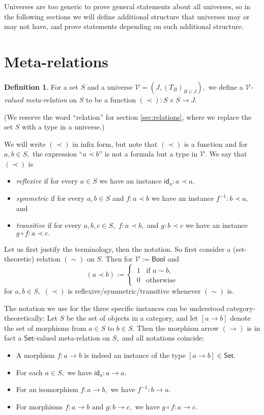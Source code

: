 \documentclass[a4paper]{article}
\theoremstyle{definition}
\newtheorem{definition}{Definition}[section]
\theoremstyle{remark}
\newcommand{\defn}{\emph}
\newcommand{\V}{\mathcal{V}}
\newcommand{\nm}{\mathsf}
\newcommand{\universe}{\nm}
\newcommand{\Bool}{\universe{Bool}}
\newcommand{\Set}{\universe{Set}}
\newcommand{\id}{\nm{id}}
\begin{document}
Universes are too generic to prove general statements about all universes, so in the following sections
we will define additional structure that universes may or may not have, and prove statements depending
on such additional structure.

\section{Meta-relations}
\label{sec:meta-relations}

\begin{definition}
  For a set $S$ and a universe $\V = (J, (T_B)_{B \in J}),$ we define a \defn{$\V$-valued meta-relation}
  on $S$ to be a function $(\prec) : S \times S \to J.$
\end{definition}

(We reserve the word ``relation'' for section \ref{sec:relations}, where we replace the set $S$ with a type
in a universe.)

We will write $(\prec)$ in infix form, but note that $(\prec)$ is a function and for $a,b \in S,$ the
expression ``$a \prec b$'' is not a formula but a type in $\V.$
We say that $(\prec)$ is
\begin{itemize}
  \item \defn{reflexive} if for every $a \in S$ we have an instance $\id_a : a \prec a,$
  \item \defn{symmetric} if for every $a,b \in S$ and $f : a \prec b$ we have an instance
  $f^{-1} : b \prec a,$ and
  \item \defn{transitive} if for every $a,b,c \in S,$ $f : a \prec b,$ and $g : b \prec c$ we have an
  instance $g \circ f : a \prec c.$
\end{itemize}

Let us first justify the terminology, then the notation. So first consider a (set-theoretic) relation
$(\sim)$ on $S.$ Then for $\V := \Bool$ and
\[(a \prec b) := \begin{cases}
  \, 1 & \text{if } a \sim b,\\
  \, 0 & \text{otherwise}
\end{cases}\]
for $a,b \in S,$ $(\prec)$ is reflexive/symmetric/transitive whenever $(\sim)$ is.

The notation we use for the three specific instances can be understood category-theoretically:
Let $S$ be the set of objects in a category, and let $[a \to b]$ denote the set of morphisms
from $a \in S$ to $b \in S.$ Then the morphism arrow $(\to)$ is in fact a $\Set$-valued
meta-relation on $S,$ and all notations coincide:
\begin{itemize}
  \item A morphism $f : a \to b$ is indeed an instance of the type $[a \to b] \in \Set.$
  \item For each $a \in S,$ we have $\id_a : a \to a.$
  \item For an isomorphism $f : a \to b,$ we have $f^{-1} : b \to a.$
  \item For morphisms $f : a \to b$ and $g : b \to c,$ we have $g \circ f : a \to c.$
\end{itemize}
\end{document}

